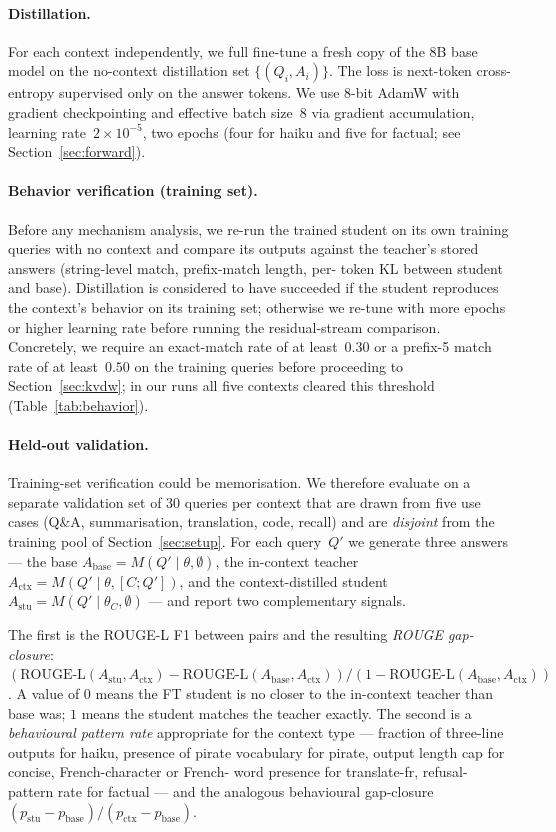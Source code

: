 \documentclass[letterpaper]{article} %
\begin{document}
\paragraph{Distillation.}
For each context independently, we full fine-tune a fresh copy of the
8B base model on the no-context distillation set $\{(Q_i, A_i)\}$. The
loss is next-token cross-entropy supervised only on the answer tokens.
We use 8-bit AdamW with gradient checkpointing and effective batch
size~$8$ via gradient accumulation, learning rate~$2 \times 10^{-5}$,
two epochs (four for haiku and five for factual; see
Section~\ref{sec:forward}).

\paragraph{Behavior verification (training set).}
Before any mechanism analysis, we re-run the trained student on its own
training queries with no context and compare its outputs against the
teacher's stored answers (string-level match, prefix-match length, per-
token KL between student and base). Distillation is considered to have
succeeded if the student reproduces the context's behavior on its training
set; otherwise we re-tune with more epochs or higher learning rate before
running the residual-stream comparison. Concretely, we require an
exact-match rate of at least~$0.30$ or a prefix-5 match rate of at
least~$0.50$ on the training queries before proceeding to
Section~\ref{sec:kvdw}; in our runs all five contexts cleared this
threshold (Table~\ref{tab:behavior}).

\paragraph{Held-out validation.}
Training-set verification could be memorisation. We therefore evaluate on
a separate validation set of 30 queries per context that are drawn from
five use cases (Q\&A, summarisation, translation, code, recall) and are
\emph{disjoint} from the training pool of Section~\ref{sec:setup}. For
each query~$Q'$ we generate three answers --- the base $A_\text{base} =
M(Q' \mid \theta, \emptyset)$, the in-context teacher $A_\text{ctx} =
M(Q' \mid \theta, [C; Q'])$, and the context-distilled student
$A_\text{stu} = M(Q' \mid \theta_C, \emptyset)$ --- and report two
complementary signals.

The first is the ROUGE-L F1 between pairs and the resulting
\emph{ROUGE gap-closure}: $(\text{ROUGE-L}(A_\text{stu}, A_\text{ctx}) -
\text{ROUGE-L}(A_\text{base}, A_\text{ctx})) / (1 -
\text{ROUGE-L}(A_\text{base}, A_\text{ctx}))$. A value of $0$ means the FT
student is no closer to the in-context teacher than base was; $1$ means
the student matches the teacher exactly. The second is a
\emph{behavioural pattern rate} appropriate for the context type ---
fraction of three-line outputs for haiku, presence of pirate vocabulary
for pirate, output length cap for concise, French-character or French-
word presence for translate-fr, refusal-pattern rate for factual --- and
the analogous behavioural gap-closure $(p_\text{stu} - p_\text{base}) /
(p_\text{ctx} - p_\text{base})$.
\end{document}
